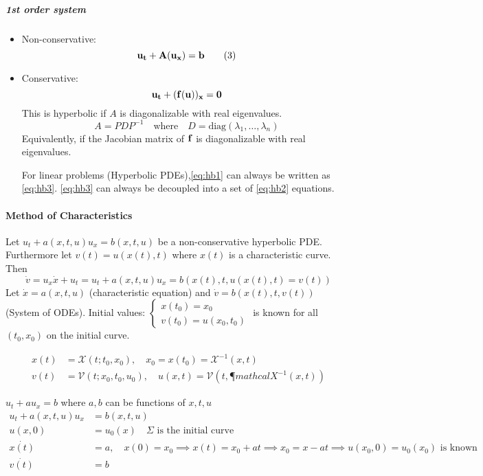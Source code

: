 \subparagraph{1st order system}
\begin{itemize}
  \item Non-conservative: \[\bf{u_t} + A(\bf{u}_x) = \bf{b}\tag{3}\]\label{eq:hb3}
  \item Conservative: \[\bf{u_t} + (\bf{f}(\bf{u}))_x = 0\]
        This is hyperbolic if \(A\) is diagonalizable with real eigenvalues.
        \[
          A = PDP^{-1} \quad \text{where} \quad D = \text{diag}(\lambda_1, \ldots, \lambda_n)
        \]
        Equivalently, if the Jacobian matrix of \(\bf{f}\) is diagonalizable with real eigenvalues.

        For linear problems (Hyperbolic PDEs),\eqref{eq:hb1} can always be written as \eqref{eq:hb3}.
        \eqref{eq:hb3} can always be decoupled into a set of \eqref{eq:hb2} equations.
\end{itemize}
\paragraph{Method of Characteristics}
Let \(u_t + a(x,t,u)u_x = b(x,t,u)\) be a non-conservative hyperbolic PDE. Furthermore let \(v(t) = u(x(t), t)\) where \(x(t)\) is a characteristic curve. Then
\[
  \dot{v} = u_x \dot{x} + u_t = u_t + a(x,t,u)u_x = b(x(t), t, u(x(t), t)=v(t))
\]
Let \(\dot{x} = a(x,t,u)\) (characteristic equation) and \(\dot{v} = b(x(t), t, v(t))\) (System of ODEs).
Initial values: \(\begin{cases} x(t_0) = x_0 \\ v(t_0) = u(x_0, t_0) \end{cases}\) is known for all \((t_0, x_0)\) on the initial curve.

\begin{align*}
  x(t) & = \mathcal{X}(t; t_0, x_0), \quad x_0 = x(t_0) = \mathcal{X}^{-1}(x, t)               \\
  v(t) & = \mathcal{V}(t; x_0, t_0, u_0), \quad u(x,t) = \mathcal{V}(t, ¶mathcal{X}^{-1}(x,t))
\end{align*}

\begin{example}{\(u_t + a u_x = b\) where \(a, b\) can be functions of \(x, t, u\)}{}
  \begin{align*}
    u_t + a(x,t,u)u_x & = b(x,t,u)                                                                                                          \\
    u(x,0)            & = u_0(x)   \quad \Sigma \text{ is the initial curve}                                                                \\
    \dot{x(t)}        & = a, \quad x(0) = x_0 \implies x(t) = x_0 + at \implies x_0 = x - at \implies u(x_0, 0) = u_0(x_0) \text{ is known} \\
    \dot{v(t)}        & = b
  \end{align*}


\end{example}


